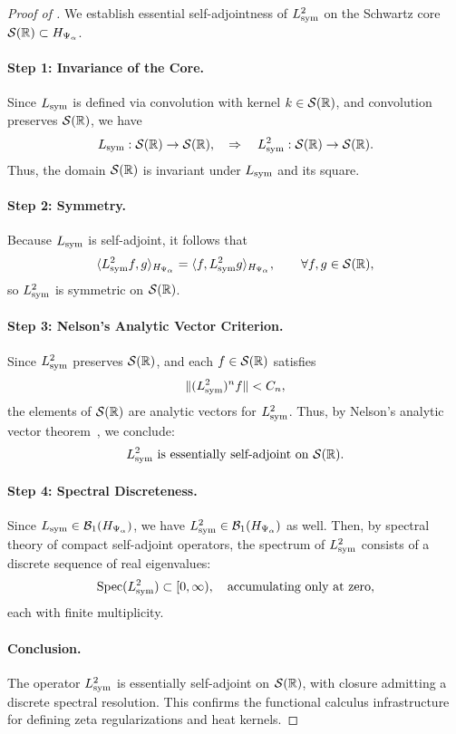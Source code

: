 \begin{proof}[Proof of ]
We establish essential self-adjointness of \( L_{\mathrm{sym}}^2 \) on the Schwartz core \( \mathcal{S}(\mathbb{R}) \subset H_{\Psi_\alpha} \).

\paragraph{Step 1: Invariance of the Core.}
Since \( L_{\mathrm{sym}} \) is defined via convolution with kernel \( k \in \mathcal{S}(\mathbb{R}) \), and convolution preserves \( \mathcal{S}(\mathbb{R}) \), we have
\[
L_{\mathrm{sym}} : \mathcal{S}(\mathbb{R}) \to \mathcal{S}(\mathbb{R}), \quad \Rightarrow \quad L_{\mathrm{sym}}^2 : \mathcal{S}(\mathbb{R}) \to \mathcal{S}(\mathbb{R}).
\]
Thus, the domain \( \mathcal{S}(\mathbb{R}) \) is invariant under \( L_{\mathrm{sym}} \) and its square.

\paragraph{Step 2: Symmetry.}
Because \( L_{\mathrm{sym}} \) is self-adjoint, it follows that
\[
\langle L_{\mathrm{sym}}^2 f, g \rangle_{H_{\Psi_\alpha}} = \langle f, L_{\mathrm{sym}}^2 g \rangle_{H_{\Psi_\alpha}}, \qquad \forall f, g \in \mathcal{S}(\mathbb{R}),
\]
so \( L_{\mathrm{sym}}^2 \) is symmetric on \( \mathcal{S}(\mathbb{R}) \).

\paragraph{Step 3: Nelson's Analytic Vector Criterion.}
Since \( L_{\mathrm{sym}}^2 \) preserves \( \mathcal{S}(\mathbb{R}) \), and each \( f \in \mathcal{S}(\mathbb{R}) \) satisfies
\[
\| (L_{\mathrm{sym}}^2)^n f \| < C_n,
\]
the elements of \( \mathcal{S}(\mathbb{R}) \) are analytic vectors for \( L_{\mathrm{sym}}^2 \). Thus, by Nelson’s analytic vector theorem~\cite[Thm.~X.36]{ReedSimon1975II}, we conclude:
\[
L_{\mathrm{sym}}^2 \text{ is essentially self-adjoint on } \mathcal{S}(\mathbb{R}).
\]

\paragraph{Step 4: Spectral Discreteness.}
Since \( L_{\mathrm{sym}} \in \mathcal{B}_1(H_{\Psi_\alpha}) \), we have \( L_{\mathrm{sym}}^2 \in \mathcal{B}_1(H_{\Psi_\alpha}) \) as well. Then, by spectral theory of compact self-adjoint operators, the spectrum of \( L_{\mathrm{sym}}^2 \) consists of a discrete sequence of real eigenvalues:
\[
\operatorname{Spec}(L_{\mathrm{sym}}^2) \subset [0, \infty), \quad \text{accumulating only at zero},
\]
each with finite multiplicity.

\paragraph{Conclusion.}
The operator \( L_{\mathrm{sym}}^2 \) is essentially self-adjoint on \( \mathcal{S}(\mathbb{R}) \), with closure admitting a discrete spectral resolution. This confirms the functional calculus infrastructure for defining zeta regularizations and heat kernels.
\end{proof}
